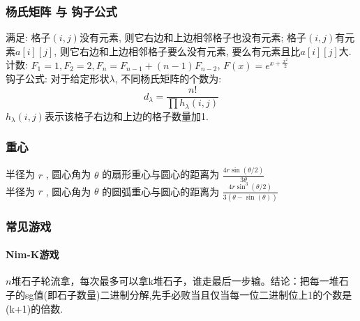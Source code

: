 \begin{small}
\subsubsection{杨氏矩阵 与 钩子公式}
满足: 格子$(i,j)$没有元素, 则它右边和上边相邻格子也没有元素; 格子$(i,j)$有元素$a[i][j]$, 则它右边和上边相邻格子要么没有元素, 要么有元素且比$a[i][j]$大.\\
计数: $F_1=1,F_2=2,F_n=F_{n-1}+(n-1)F_{n-2}$, $F(x)=e^{x+\frac{x^2}{2}}$\\
钩子公式: 对于给定形状$\lambda$, 不同杨氏矩阵的个数为:
\[d_\lambda=\frac{n!}{\prod h_\lambda(i,j)}\]
$h_\lambda(i,j)$表示该格子右边和上边的格子数量加1. 
\subsubsection{重心}
半径为 $r$ , 圆心角为 $\theta$ 的扇形重心与圆心的距离为 $\frac{4r\sin(\theta/2)}{3\theta}$ \\
半径为 $r$ , 圆心角为 $\theta$ 的圆弧重心与圆心的距离为 $\frac{4r\sin^3(\theta/2)}{3(\theta-\sin(\theta))}$ \\

\subsubsection{常见游戏}
\begin{multicols}{2}
\paragraph{Nim-K游戏}$n$堆石子轮流拿，每次最多可以拿k堆石子，谁走最后一步输。结论：把每一堆石子的sg值(即石子数量)二进制分解,先手必败当且仅当每一位二进制位上1的个数是(k+1)的倍数. 

\end{multicols}
\end{small}

